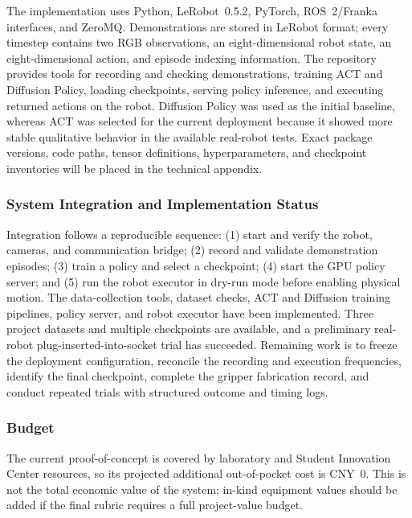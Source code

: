 \documentclass[12pt, letterpaper]{article}
\begin{document}
The implementation uses Python, LeRobot~0.5.2, PyTorch, ROS~2/Franka
interfaces, and ZeroMQ. Demonstrations are stored in LeRobot format; every
timestep contains two RGB observations, an eight-dimensional robot state, an
eight-dimensional action, and episode indexing information. The repository
provides tools for recording and checking demonstrations, training ACT and
Diffusion Policy, loading checkpoints, serving policy inference, and executing
returned actions on the robot. Diffusion Policy was used as the initial
baseline, whereas ACT was selected for the current deployment because it showed
more stable qualitative behavior in the available real-robot tests. Exact
package versions, code paths, tensor definitions, hyperparameters, and
checkpoint inventories will be placed in the technical appendix.

\subsubsection{System Integration and Implementation Status}

Integration follows a reproducible sequence: (1) start and verify the robot,
cameras, and communication bridge; (2) record and validate demonstration
episodes; (3) train a policy and select a checkpoint; (4) start the GPU policy
server; and (5) run the robot executor in dry-run mode before enabling physical
motion. The data-collection tools, dataset checks, ACT and Diffusion training
pipelines, policy server, and robot executor have been implemented. Three
project datasets and multiple checkpoints are available, and a preliminary
real-robot plug-inserted-into-socket trial has succeeded. Remaining work is to freeze the
deployment configuration, reconcile the recording and execution frequencies,
identify the final checkpoint, complete the gripper fabrication record, and
conduct repeated trials with structured outcome and timing logs.

\subsubsection{Budget}

The current proof-of-concept is covered by laboratory and Student Innovation
Center resources, so its projected additional out-of-pocket cost is CNY~0.
This is not the total economic value of the system; in-kind equipment values
should be added if the final rubric requires a full project-value budget.
\end{document}

